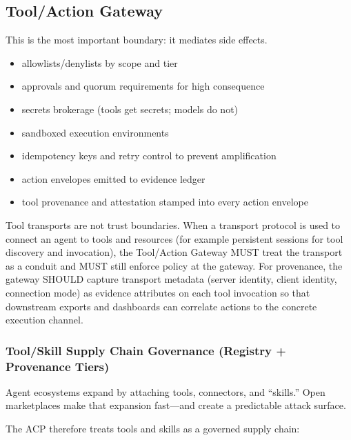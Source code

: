 \documentclass[11pt]{article}
\begin{document}
\hypertarget{toolaction-gateway}{%
\subsection{Tool/Action Gateway}\label{toolaction-gateway}}

This is the most important boundary: it mediates side effects.

\begin{itemize}
\tightlist
\item
  allowlists/denylists by scope and tier
\item
  approvals and quorum requirements for high consequence
\item
  secrets brokerage (tools get secrets; models do not)
\item
  sandboxed execution environments
\item
  idempotency keys and retry control to prevent amplification
\item
  action envelopes emitted to evidence ledger
\item
  tool provenance and attestation stamped into every action envelope
\end{itemize}

Tool transports are not trust boundaries. When a transport protocol is
used to connect an agent to tools and resources (for example persistent
sessions for tool discovery and invocation), the Tool/Action Gateway
MUST treat the transport as a conduit and MUST still enforce policy at
the gateway. For provenance, the gateway SHOULD capture transport
metadata (server identity, client identity, connection mode) as evidence
attributes on each tool invocation so that downstream exports and
dashboards can correlate actions to the concrete execution channel.

\hypertarget{toolskill-supply-chain-governance-registry-provenance-tiers}{%
\subsubsection{Tool/Skill Supply Chain Governance (Registry + Provenance Tiers)}\label{toolskill-supply-chain-governance-registry-provenance-tiers}}

Agent ecosystems expand by attaching tools, connectors, and ``skills.''
Open marketplaces make that expansion fast---and create a predictable
attack surface.

The ACP therefore treats tools and skills as a governed supply chain:
\end{document}

